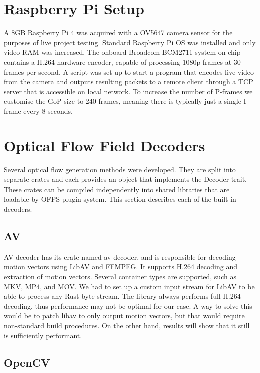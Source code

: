\documentclass[11pt,english]{report}
\begin{document}
\section{Raspberry Pi Setup}

A 8GB Raspberry Pi 4 was acquired with a OV5647 camera sensor for the purposes of live project testing. Standard Raspberry Pi OS was installed and only video RAM was increased. The onboard Broadcom BCM2711 system-on-chip contains a H.264 hardware encoder, capable of processing 1080p frames at 30 frames per second. A script was set up to start a program that encodes live video from the camera and outputs resulting packets to a remote client through a TCP server that is accessible on local network. To increase the number of P-frames we customise the GoP size to 240 frames, meaning there is typically just a single I-frame every 8 seconds.

\section{Optical Flow Field Decoders}

Several optical flow generation methods were developed. They are split into separate crates and each provides an object that implements the Decoder trait. These crates can be compiled independently into shared libraries that are loadable by OFPS plugin system. This section describes each of the built-in decoders.

\subsection{AV}

AV decoder has its crate named av-decoder, and is responsible for decoding motion vectors using LibAV and FFMPEG. It supports H.264 decoding and extraction of motion vectors. Several container types are supported, such as MKV, MP4, and MOV. We had to set up a custom input stream for LibAV to be able to process any Rust byte stream. The library always performs full H.264 decoding, thus performance may not be optimal for our case. A way to solve this would be to patch libav to only output motion vectors\cite{libav-patch}, but that would require non-standard build procedures. On the other hand, results will show that it still is sufficiently performant.

\subsection{OpenCV}
\end{document}
